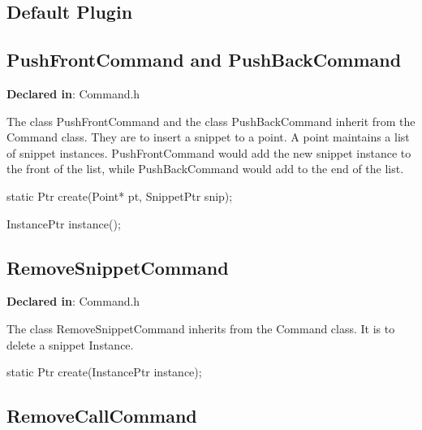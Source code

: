 
\subsection{Default Plugin}
\label{sec-3.3}

\subsection{PushFrontCommand and PushBackCommand}
\label{sec-3.3.1}

\textbf{Declared in}: Command.h

The class PushFrontCommand and the class PushBackCommand inherit from the
Command class. They are to insert a snippet to a point. A point maintains a
list of snippet instances. PushFrontCommand would add the new snippet instance
to the front of the list, while PushBackCommand would add to the end of the
list.


\begin{apient}
static Ptr create(Point* pt, SnippetPtr snip);
\end{apient}


\begin{apient}
InstancePtr instance();
\end{apient}


\subsection{RemoveSnippetCommand}
\label{sec-3.3.2}

\textbf{Declared in}: Command.h

The class RemoveSnippetCommand inherits from the Command class. It is to delete
a snippet Instance.


\begin{apient}
static Ptr create(InstancePtr instance);
\end{apient}


\subsection{RemoveCallCommand}
\label{sec-3.3.3}

